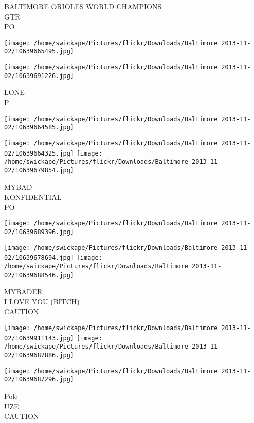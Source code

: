 \documentclass[10pt,letterpaper]{article}
\begin{document}
BALTIMORE ORIOLES WORLD CHAMPIONS\\
GTR\\
PO\\
\pagebreak

\texttt{[image: /home/swickape/Pictures/flickr/Downloads/Baltimore 2013-11-02/10639665495.jpg]}

\vspace{0.25in}
\texttt{[image: /home/swickape/Pictures/flickr/Downloads/Baltimore 2013-11-02/10639691226.jpg]}

LONE\\
P\\
\pagebreak

\texttt{[image: /home/swickape/Pictures/flickr/Downloads/Baltimore 2013-11-02/10639664585.jpg]}

\vspace{0.25in}
\texttt{[image: /home/swickape/Pictures/flickr/Downloads/Baltimore 2013-11-02/10639664325.jpg]}
\texttt{[image: /home/swickape/Pictures/flickr/Downloads/Baltimore 2013-11-02/10639679854.jpg]}

MYBAD\\
KONFIDENTIAL\\
PO\\
\pagebreak

\texttt{[image: /home/swickape/Pictures/flickr/Downloads/Baltimore 2013-11-02/10639689396.jpg]}

\vspace{0.25in}
\texttt{[image: /home/swickape/Pictures/flickr/Downloads/Baltimore 2013-11-02/10639678694.jpg]}
\texttt{[image: /home/swickape/Pictures/flickr/Downloads/Baltimore 2013-11-02/10639688546.jpg]}

MYBADER\\
I LOVE YOU (BITCH)\\
CAUTION\\
\pagebreak

\texttt{[image: /home/swickape/Pictures/flickr/Downloads/Baltimore 2013-11-02/10639911143.jpg]}
\texttt{[image: /home/swickape/Pictures/flickr/Downloads/Baltimore 2013-11-02/10639687886.jpg]}

\vspace{0.25in}
\texttt{[image: /home/swickape/Pictures/flickr/Downloads/Baltimore 2013-11-02/10639687296.jpg]}

Pole\\
UZE\\
CAUTION\\
\pagebreak
\end{document}
